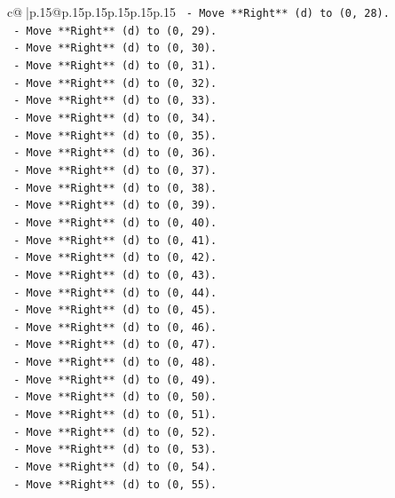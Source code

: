 \documentclass{article}
\begin{document}
{\begin{supertabular}{c@{$\;$}|p{.15\linewidth}@{}p{.15\linewidth}p{.15\linewidth}p{.15\linewidth}p{.15\linewidth}p{.15\linewidth}}
{{{\texttt{        {-} Move **Right** (d) to (0, 28).} \\
\texttt{        {-} Move **Right** (d) to (0, 29).} \\
\texttt{        {-} Move **Right** (d) to (0, 30).} \\
\texttt{        {-} Move **Right** (d) to (0, 31).} \\
\texttt{        {-} Move **Right** (d) to (0, 32).} \\
\texttt{        {-} Move **Right** (d) to (0, 33).} \\
\texttt{        {-} Move **Right** (d) to (0, 34).} \\
\texttt{        {-} Move **Right** (d) to (0, 35).} \\
\texttt{        {-} Move **Right** (d) to (0, 36).} \\
\texttt{        {-} Move **Right** (d) to (0, 37).} \\
\texttt{        {-} Move **Right** (d) to (0, 38).} \\
\texttt{        {-} Move **Right** (d) to (0, 39).} \\
\texttt{        {-} Move **Right** (d) to (0, 40).} \\
\texttt{        {-} Move **Right** (d) to (0, 41).} \\
\texttt{        {-} Move **Right** (d) to (0, 42).} \\
\texttt{        {-} Move **Right** (d) to (0, 43).} \\
\texttt{        {-} Move **Right** (d) to (0, 44).} \\
\texttt{        {-} Move **Right** (d) to (0, 45).} \\
\texttt{        {-} Move **Right** (d) to (0, 46).} \\
\texttt{        {-} Move **Right** (d) to (0, 47).} \\
\texttt{        {-} Move **Right** (d) to (0, 48).} \\
\texttt{        {-} Move **Right** (d) to (0, 49).} \\
\texttt{        {-} Move **Right** (d) to (0, 50).} \\
\texttt{        {-} Move **Right** (d) to (0, 51).} \\
\texttt{        {-} Move **Right** (d) to (0, 52).} \\
\texttt{        {-} Move **Right** (d) to (0, 53).} \\
\texttt{        {-} Move **Right** (d) to (0, 54).} \\
\texttt{        {-} Move **Right** (d) to (0, 55).} \\
}}}
\end{supertabular}}
\end{document}
